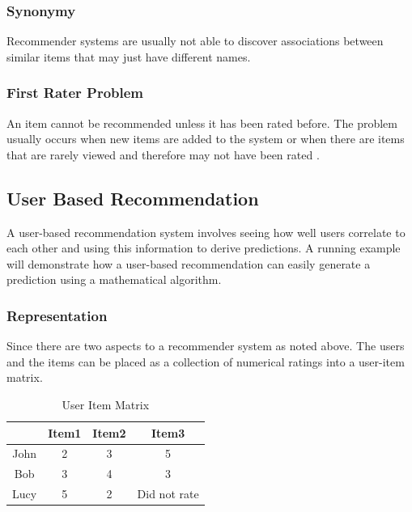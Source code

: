 \subsubsection{Synonymy}
Recommender systems are usually not able to discover associations between similar items that may just have different names.
\subsubsection{First Rater Problem}
An item cannot be recommended unless it has been rated before. The problem usually occurs when new items are added to the system or when there are items that are rarely viewed and therefore may not have been rated \citep{literature_6}.

\subsection{User Based Recommendation}
A user-based recommendation system involves seeing how well users correlate to each other and using this information to derive predictions. A running example will demonstrate how a user-based recommendation can easily generate a prediction using a mathematical algorithm.

\subsubsection{Representation}
Since there are two aspects to a recommender system as noted above. The users and the items can be placed as a collection of numerical ratings into a user-item matrix.\\
\begin{table}[ht]
\caption{User Item Matrix} %
\centering  %
\begin{tabular}{c c c c} %
\hline\hline                        %
 & Item1 & Item2& Item3 \\ [0.5ex] %
\hline                  %

John & 2 & 3  & 5  \\
Bob & 3 & 4 & 3 \\
Lucy & 5 & 2& Did not rate \\[1ex]      %
\hline %
\end{tabular}
\label{table:3} %
\end{table}

